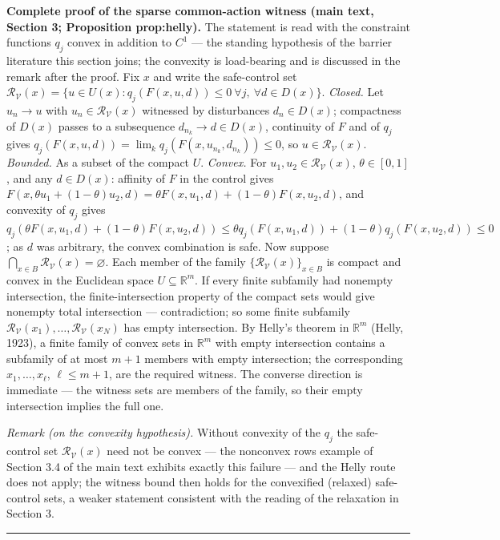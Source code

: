 \documentclass[11pt]{article}
\theoremstyle{definition}
\begin{document}
\bigskip
\noindent\textbf{Complete proof of the sparse common-action witness
(main text, Section 3; Proposition prop:helly).}
The statement is read with the constraint functions \(q_{j}\) convex in
addition to \(C^{1}\) --- the standing hypothesis of the barrier
literature this section joins; the convexity is load-bearing and is
discussed in the remark after the proof. Fix \(x\) and write the
safe-control set
\(\mathcal{R}_{\mathcal{V}}(x) = \{u \in U(x) : q_{j}(F(x, u, d)) \le 0
\ \forall j,\ \forall d \in D(x)\}\).
\emph{Closed.} Let \(u_{n} \to u\) with \(u_{n} \in
\mathcal{R}_{\mathcal{V}}(x)\) witnessed by disturbances
\(d_{n} \in D(x)\); compactness of \(D(x)\) passes to a subsequence
\(d_{n_{k}} \to d \in D(x)\), continuity of \(F\) and of \(q_{j}\) gives
\(q_{j}(F(x, u, d)) = \lim_{k} q_{j}(F(x, u_{n_{k}}, d_{n_{k}})) \le 0\),
so \(u \in \mathcal{R}_{\mathcal{V}}(x)\). \emph{Bounded.} As a subset
of the compact \(U\). \emph{Convex.} For \(u_{1}, u_{2} \in
\mathcal{R}_{\mathcal{V}}(x)\), \(\theta \in [0,1]\), and any
\(d \in D(x)\): affinity of \(F\) in the control gives
\(F(x, \theta u_{1} + (1 - \theta) u_{2}, d) = \theta F(x, u_{1}, d) +
(1 - \theta) F(x, u_{2}, d)\), and convexity of \(q_{j}\) gives
\(q_{j}(\theta F(x, u_{1}, d) + (1 - \theta) F(x, u_{2}, d)) \le
\theta q_{j}(F(x, u_{1}, d)) + (1 - \theta) q_{j}(F(x, u_{2}, d)) \le
0\); as \(d\) was arbitrary, the convex combination is safe. Now
suppose \(\bigcap_{x \in B} \mathcal{R}_{\mathcal{V}}(x) = \varnothing\).
Each member of the family \(\{\mathcal{R}_{\mathcal{V}}(x)\}_{x \in B}\)
is compact and convex in the Euclidean space \(U \subseteq
\mathbb{R}^{m}\). If every finite subfamily had nonempty intersection,
the finite-intersection property of the compact sets would give nonempty
total intersection --- contradiction; so some finite subfamily
\(\mathcal{R}_{\mathcal{V}}(x_{1}), \dots,
\mathcal{R}_{\mathcal{V}}(x_{N})\) has empty intersection. By Helly's
theorem in \(\mathbb{R}^{m}\) (Helly, 1923), a finite family of convex
sets in \(\mathbb{R}^{m}\) with empty intersection contains a
subfamily of at most \(m + 1\) members with empty intersection; the
corresponding \(x_{1}, \dots, x_{\ell}\), \(\ell \le m + 1\), are the
required witness. The converse direction is immediate --- the witness
sets are members of the family, so their empty intersection implies the
full one. \smallskip

\emph{Remark (on the convexity hypothesis).} Without convexity of the
\(q_{j}\) the safe-control set \(\mathcal{R}_{\mathcal{V}}(x)\) need not
be convex --- the nonconvex rows example of Section 3.4 of the main text
exhibits exactly this failure --- and the Helly route does not apply;
the witness bound then holds for the convexified (relaxed) safe-control
sets, a weaker statement consistent with the reading of the relaxation
in Section 3. \rule{0.5\linewidth}{0.5pt}
\end{document}
